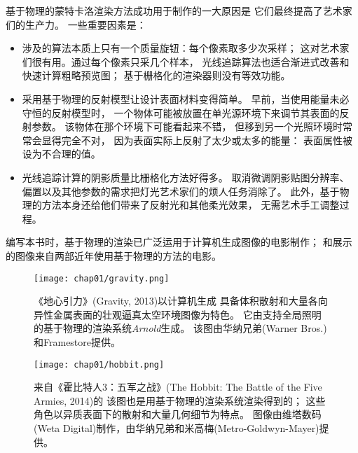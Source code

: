 基于物理的蒙特卡洛渲染方法成功用于制作的一大原因是
它们最终提高了艺术家们的生产力。
一些重要因素是：
\begin{itemize}
    \item 涉及的算法本质上只有一个质量旋钮：每个像素取多少次采样；
          这对艺术家们很有用。通过每个像素只采几个样本，
          光线追踪算法也适合渐进式改善和快速计算粗略预览图；
          基于栅格化的渲染器则没有等效功能。
    \item 采用基于物理的反射模型让设计表面材料变得简单。
          早前，当使用能量未必守恒的反射模型时，
          一个物体可能被放置在单光源环境下来调节其表面的反射参数。
          该物体在那个环境下可能看起来不错，
          但移到另一个光照环境时常常会显得完全不对，
          因为表面实际上反射了太少或太多的能量：
          表面属性被设为不合理的值。
    \item 光线追踪计算的阴影质量比栅格化方法好得多。
          取消微调阴影贴图分辨率、偏置以及其他参数的需求把灯光艺术家们的烦人任务消除了。
          此外，基于物理的方法本身还给他们带来了反射光和其他柔光效果，
          无需艺术手工调整过程。
\end{itemize}

编写本书时，基于物理的渲染已广泛运用于计算机生成图像的电影制作；
和展示的图像来自两部近年使用基于物理的方法的电影。
\begin{figure}[htbp]
    \centering\texttt{[image: chap01/gravity.png]}
    \caption{《地心引力》(Gravity, 2013)以计算机生成
        具备体积散射和大量各向异性金属表面的壮观逼真太空环境图像为特色。
        它由支持全局照明的基于物理的渲染系统\emph{Arnold}生成。
        该图由华纳兄弟(Warner Bros.)和Framestore提供。
    }
    \label{fig:1.22}
\end{figure}
\begin{figure}[htbp]
    \centering\texttt{[image: chap01/hobbit.png]}
    \caption{来自《霍比特人3：五军之战》(The Hobbit: The Battle of the Five Armies, 2014)的
        该图也是用基于物理的渲染系统渲染得到的；
        这些角色以异质表面下的散射和大量几何细节为特点。
        图像由维塔数码(Weta Digital)制作，由华纳兄弟和米高梅(Metro-Goldwyn-Mayer)提供。}
    \label{fig:1.23}
\end{figure}

